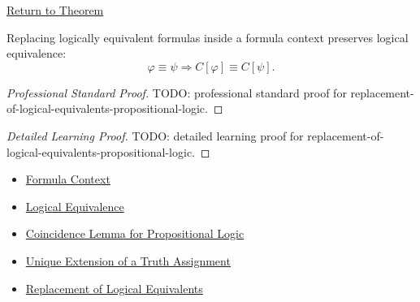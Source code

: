 \newpage
{}
\label{prf:replacement-of-logical-equivalents-propositional-logic}

\begin{remark*}[Return]
\hyperref[thm:replacement-of-logical-equivalents-propositional-logic]{Return to Theorem}
\end{remark*}

\begin{theorem*}
Replacing logically equivalent formulas inside a formula context preserves logical equivalence:
\[
\varphi\equiv\psi
\Longrightarrow
C[\varphi]\equiv C[\psi].
\]
\end{theorem*}

\begin{proof}[Professional Standard Proof]
\LRAProofBodyStart
TODO: professional standard proof for replacement-of-logical-equivalents-propositional-logic.
\end{proof}

\begin{proof}[Detailed Learning Proof]
\LRAProofBodyStart
TODO: detailed learning proof for replacement-of-logical-equivalents-propositional-logic.
\end{proof}

\begin{remark*}
\end{remark*}

\begin{dependencies}
\begin{itemize}
  \item \hyperref[def:formula-context-propositional-logic]{Formula Context}
  \item \hyperref[def:logical-equivalence-propositional-logic]{Logical Equivalence}
  \item \hyperref[lem:coincidence-lemma-propositional-logic]{Coincidence Lemma for Propositional Logic}
  \item \hyperref[thm:unique-extension-truth-assignment-propositional-logic]{Unique Extension of a Truth Assignment}
  \item \hyperref[thm:replacement-of-logical-equivalents-propositional-logic]{Replacement of Logical Equivalents}
\end{itemize}
\end{dependencies}

\clearpage
